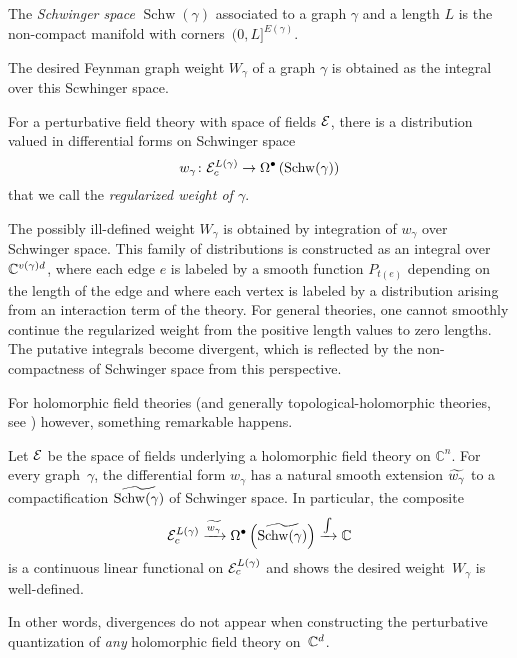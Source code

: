 \documentclass[11pt]{amsart}
\def\til{\Tilde}
\def\C{{\mathbb{C}}}
\renewcommand{\op}{\operatorname}
\def\owen#1{{\textcolor{violet!50!black}{OG: {#1}}}}
\begin{document}
\begin{dfn}
The {\em Schwinger space} $\op{Schw}(\gamma)$ associated to a graph $\gamma$ and a length $L$ is the non-compact manifold with corners~$(0,L]^{E(\gamma)}$.
\end{dfn}

The desired Feynman graph weight $W_\gamma$ of a graph $\gamma$ is obtained as the integral over this Scwhinger space. 

\begin{dfn}
For a perturbative field theory with space of fields $\mathcal E$, there is a distribution valued in differential forms on Schwinger space
\[
w_{\gamma} \colon \cE^{L(\gamma)}_c \to \Omega^\bu \left( \op{Schw}(\gamma) \right)
\]
that we call the {\em regularized weight of $\gamma$}.
\end{dfn}

The possibly ill-defined weight $W_\gamma$ is obtained by integration of $w_\gamma$ over Schwinger space.
This family of distributions is constructed as an integral over $\mathbb C^{v(\gamma) d}$,
where each edge $e$ is labeled by a smooth function $P_{t(e)}$ depending on the length of the edge and where each vertex is labeled by a distribution arising from an interaction term of the theory.
For general theories, one cannot smoothly continue the regularized weight from the positive length values to zero lengths.
The putative integrals become divergent, which is reflected by the non-compactness of Schwinger space from this perspective.

For holomorphic field theories (and generally topological-holomorphic theories, see \cite{WWthf}) however, something remarkable happens.

\begin{thm}[Wang, \owen{precise citations}]
Let $\mathcal E$ be the space of fields underlying a holomorphic field theory on $\C^n$.
For every graph~$\gamma$, the differential form $w_{\gamma}$ has a natural smooth extension $\til {w_\gamma}$ to a compactification $\til{\op{Schw}(\gamma)}$ of Schwinger space.
In particular, the composite
\[
\cE^{L(\gamma)}_c \xto{\til{w_\gamma}}\Omega^\bu \left( \til{\op{Schw}(\gamma)} \right) \xto{\int} \C
\]
is a continuous linear functional on $\mathcal E_c^{L(\gamma)}$ and shows the desired weight~$W_\gamma$ is well-defined.
\end{thm}

In other words, divergences do not appear when constructing the perturbative quantization of {\em any} holomorphic field theory on~$\mathbb C^d$.
\end{document}
